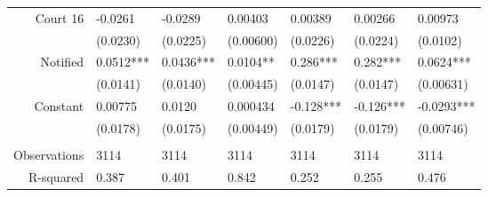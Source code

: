 \begin{tabular}{rrrrrrr}
Court 16 & \multicolumn{1}{l}{-0.0261} & \multicolumn{1}{l}{-0.0289} & \multicolumn{1}{l}{0.00403} & \multicolumn{1}{l}{0.00389} & \multicolumn{1}{l}{0.00266} & \multicolumn{1}{l}{0.00973} \\
      & \multicolumn{1}{l}{(0.0230)} & \multicolumn{1}{l}{(0.0225)} & \multicolumn{1}{l}{(0.00600)} & \multicolumn{1}{l}{(0.0226)} & \multicolumn{1}{l}{(0.0224)} & \multicolumn{1}{l}{(0.0102)} \\
Notified & \multicolumn{1}{l}{0.0512***} & \multicolumn{1}{l}{0.0436***} & \multicolumn{1}{l}{0.0104**} & \multicolumn{1}{l}{0.286***} & \multicolumn{1}{l}{0.282***} & \multicolumn{1}{l}{0.0624***} \\
      & \multicolumn{1}{l}{(0.0141)} & \multicolumn{1}{l}{(0.0140)} & \multicolumn{1}{l}{(0.00445)} & \multicolumn{1}{l}{(0.0147)} & \multicolumn{1}{l}{(0.0147)} & \multicolumn{1}{l}{(0.00631)} \\
Constant  & \multicolumn{1}{l}{0.00775} & \multicolumn{1}{l}{0.0120} & \multicolumn{1}{l}{0.000434} & \multicolumn{1}{l}{-0.128***} & \multicolumn{1}{l}{-0.126***} & \multicolumn{1}{l}{-0.0293***} \\
      & \multicolumn{1}{l}{(0.0178)} & \multicolumn{1}{l}{(0.0175)} & \multicolumn{1}{l}{(0.00449)} & \multicolumn{1}{l}{(0.0179)} & \multicolumn{1}{l}{(0.0179)} & \multicolumn{1}{l}{(0.00746)} \\
      & \multicolumn{1}{l}{} & \multicolumn{1}{l}{} & \multicolumn{1}{l}{} & \multicolumn{1}{l}{} & \multicolumn{1}{l}{} & \multicolumn{1}{l}{} \\
Observations & \multicolumn{1}{l}{3114} & \multicolumn{1}{l}{3114} & \multicolumn{1}{l}{3114} & \multicolumn{1}{l}{3114} & \multicolumn{1}{l}{3114} & \multicolumn{1}{l}{3114} \\
R-squared & \multicolumn{1}{l}{0.387} & \multicolumn{1}{l}{0.401} & \multicolumn{1}{l}{0.842} & \multicolumn{1}{l}{0.252} & \multicolumn{1}{l}{0.255} & \multicolumn{1}{l}{0.476} \\
\bottomrule
\end{tabular}%
